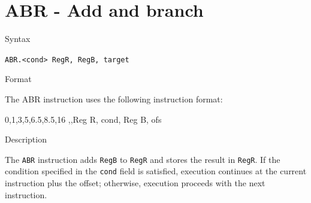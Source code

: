 %
%
\pagebreak
\section*{ABR - Add and branch}

\begin{iPageDescEntry}{Syntax}

	\texttt{ABR.<cond> RegR, RegB, target}
	
\end{iPageDescEntry}

\begin{iPageDescEntry}{Format}

The ABR instruction uses the following instruction format:
	
\begin{flushleft}
\drawInstrFormat
  	{0,1,3,5,6.5,8.5,16}
  	{\OpCodeGrpBR,\OpCodeABR,Reg R, cond, Reg B, ofs }
\end{flushleft}
\end{iPageDescEntry}

\begin{iPageDescEntry}{Description}

The \texttt{ABR} instruction adds \texttt{RegB} to \texttt{RegR} and stores the result in \texttt{RegR}. If the condition specified in the \texttt{cond} field is satisfied, execution continues at the current instruction plus the offset; otherwise, execution proceeds with the next instruction.

\end{iPageDescEntry}

